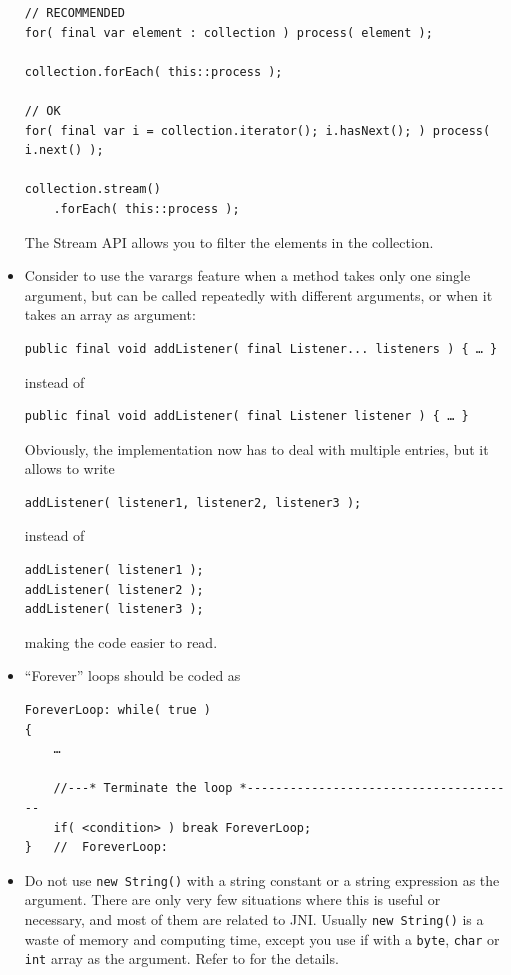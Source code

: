 \documentclass[11pt,a4paper, titlepage, parskip=half, headsepline, footsepline, cleardoublepage=current, headheight=1cm]{scrbook}
\begin{document}
\begin{itemize}
{\begin{lstlisting}
// RECOMMENDED
for( final var element : collection ) process( element );

collection.forEach( this::process );

// OK
for( final var i = collection.iterator(); i.hasNext(); ) process( i.next() );

collection.stream()
    .forEach( this::process );
\end{lstlisting}

The Stream API allows you to filter the elements in the collection.}

\item{Consider to use the varargs feature when a method takes only one single argument, but can be called repeatedly with different arguments, or when it takes an array as argument:

\begin{lstlisting}
public final void addListener( final Listener... listeners ) { … }
\end{lstlisting}

instead of
\begin{lstlisting}
public final void addListener( final Listener listener ) { … }
\end{lstlisting}

Obviously, the implementation now has to deal with multiple entries, but it allows to write
\begin{lstlisting}
addListener( listener1, listener2, listener3 );
\end{lstlisting}
instead of
\begin{lstlisting}
addListener( listener1 );
addListener( listener2 );
addListener( listener3 );
\end{lstlisting}
making the code easier to read.}

\item{“Forever” loops should be coded as
\begin{lstlisting}
ForeverLoop: while( true ) 
{ 
    … 
    
    //---* Terminate the loop *--------------------------------------
    if( <condition> ) break ForeverLoop;
}   //  ForeverLoop:
\end{lstlisting} }

\item{Do not use \lstinline|new String()| with a string constant or a string expression as the argument. There are only very few situations where this is useful or necessary, and most of them are related to JNI. Usually \lstinline|new String()| is a waste of memory and computing time, except you use if with a \lstinline|byte|, \lstinline|char| or \lstinline|int| array as the argument. Refer to \autocite{ORACLE_DOC_STRING_CLASS} for the details.}


\end{itemize}
\end{document}
